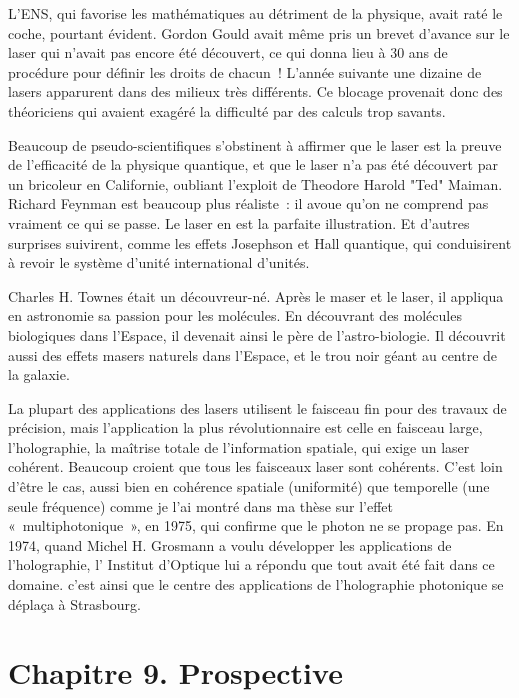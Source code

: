 \documentclass[a4paper,12pt]{article}
\begin{document}
L'ENS, qui favorise les mathématiques au détriment de la physique, avait raté le coche, pourtant évident. Gordon Gould avait même pris un brevet d'avance sur le laser qui n'avait pas encore été découvert, ce qui donna lieu à 30 ans de procédure pour définir les droits de chacun ! L'année suivante une dizaine de lasers apparurent dans des milieux très différents. Ce blocage provenait donc des théoriciens qui avaient exagéré la difficulté par des calculs trop savants.

Beaucoup de pseudo-scientifiques s'obstinent à affirmer que le laser est la preuve de l'efficacité de la physique quantique, et que le laser n'a pas été découvert par un bricoleur en Californie, oubliant l'exploit de Theodore Harold "Ted" Maiman. Richard Feynman est beaucoup plus réaliste : il avoue qu'on ne comprend pas vraiment ce qui se passe. Le laser en est la parfaite illustration. Et d'autres surprises suivirent, comme les effets Josephson et Hall quantique, qui conduisirent à revoir le système d'unité international d'unités.

Charles H. Townes était un découvreur-né. Après le maser et le laser, il appliqua en astronomie sa passion pour les molécules. En découvrant des molécules biologiques dans l'Espace, il devenait ainsi le père de l'astro-biologie. Il découvrit aussi des effets masers naturels dans l'Espace, et le trou noir géant au centre de la galaxie.    

La plupart des applications des lasers utilisent le faisceau fin pour des travaux de précision, mais l'application la plus révolutionnaire est celle en faisceau large, l'holographie, la maîtrise totale de l'information spatiale, qui exige un laser cohérent. Beaucoup croient que tous les faisceaux laser sont cohérents. C'est loin d'être le cas, aussi bien en cohérence spatiale (uniformité) que temporelle (une seule fréquence) comme je l'ai montré dans ma thèse sur l'effet « multiphotonique », en 1975, qui confirme que le photon ne se propage pas. En 1974, quand Michel H. Grosmann a voulu développer les applications de l'holographie, l' Institut d'Optique lui a répondu que tout avait été fait dans ce domaine. c'est ainsi que le centre des applications de l'holographie photonique se déplaça à Strasbourg.







\section{Chapitre 9. Prospective}
\end{document}
